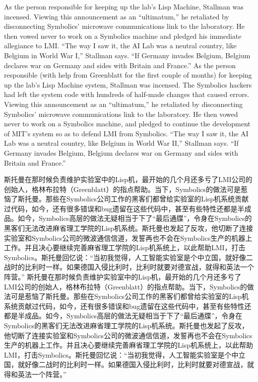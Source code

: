 \ifdefined\eng
\ifdefined\vone
As the person responsible for keeping up the lab's Lisp Machine, Stallman was incensed. Viewing this announcement as an ``ultimatum,'' he retaliated by disconnecting Symbolics' microwave communications link to the laboratory. He then vowed never to work on a Symbolics machine and pledged his immediate allegiance to LMI. ``The way I saw it, the AI Lab was a neutral country, like Belgium in World War I,'' Stallman says. ``If Germany invades Belgium, Belgium declares war on Germany and sides with Britain and France.''
\fi
\ifdefined\vtwo
As the person responsible (with help from Greenblatt for the first couple of months) for keeping up the lab's Lisp Machine system, Stallman was incensed. The Symbolics hackers had left the system code with hundreds of half-made changes that caused errors. Viewing this announcement as an ``ultimatum,'' he retaliated by disconnecting Symbolics' microwave communications link to the laboratory. He then vowed never to work on a Symbolics machine, and pledged to continue the development of MIT's system so as to defend LMI from Symbolics. ``The way I saw it, the AI Lab was a neutral country, like Belgium in World War II,'' Stallman says. ``If Germany invades Belgium, Belgium declares war on Germany and sides with Britain and France.''
\fi
\fi

\ifdefined\chs
\ifdefined\vone
斯托曼在那时候负责维护实验室中的Lisp机，最开始的几个月还多亏了LMI公司的创始人，格林布拉特（Greenblatt）的指点帮助。当下，Symbolics的做法可是惹恼了斯托曼。那些在Symbolics公司工作的黑客们都曾给实验室的Lisp机系统贡献过代码，如今，还有很多错误和bug遗留在这些代码中，甚至有些特性还都是半成品。如今，Symbolics高层的做法无疑相当于下了``最后通牒''，令身在Symbolics的黑客们无法改进麻省理工学院的Lisp机系统。斯托曼也发起了反攻，他切断了连接实验室和Symbolics公司的微波通信信道，发誓再也不会在Symbolics生产的机器上工作。并且决心要继续完善麻省理工学院的Lisp机系统上，以此帮助LMI，打击Symbolics。斯托曼回忆说：``当初我觉得，人工智能实验室是个中立国，就好像二战时的比利时一样。如果德国入侵比利时，比利时就要对德宣战，就得和英法一个阵营。''
\fi
\ifdefined\vtwo
斯托曼在那时候负责维护实验室中的Lisp机，最开始的几个月还多亏了LMI公司的创始人，格林布拉特（Greenblatt）的指点帮助。当下，Symbolics的做法可是惹恼了斯托曼。那些在Symbolics公司工作的黑客们都曾给实验室的Lisp机系统贡献过代码，如今，还有很多错误和bug遗留在这些代码中，甚至有些特性还都是半成品。如今，Symbolics高层的做法无疑相当于下了``最后通牒''，令身在Symbolics的黑客们无法改进麻省理工学院的Lisp机系统。斯托曼也发起了反攻，他切断了连接实验室和Symbolics公司的微波通信信道，发誓再也不会在Symbolics生产的机器上工作。并且决心要继续完善麻省理工学院的Lisp机系统上，以此帮助LMI，打击Symbolics。斯托曼回忆说：``当初我觉得，人工智能实验室是个中立国，就好像二战时的比利时一样。如果德国入侵比利时，比利时就要对德宣战，就得和英法一个阵营。''
\fi
\fi

